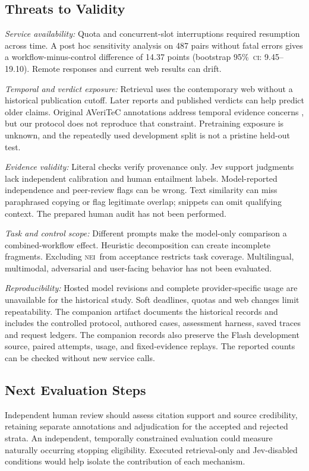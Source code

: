 \documentclass[conference]{IEEEtran}
\newcommand{\NEI}{\textsc{nei}}
\newcommand{\CI}{\textsc{ci}}
\newcommand{\pct}{\%}
\begin{document}
\subsection{Threats to Validity}
\textit{Service availability:} Quota and concurrent-slot interruptions required resumption across time. A post hoc sensitivity analysis on 487 pairs without fatal errors gives a workflow-minus-control difference of 14.37 points (bootstrap 95\pct\ \CI: 9.45--19.10). Remote responses and current web results can drift.

\textit{Temporal and verdict exposure:} Retrieval uses the contemporary web without a historical publication cutoff. Later reports and published verdicts can help predict older claims. Original AVeriTeC annotations address temporal evidence concerns \cite{averitec}, but our protocol does not reproduce that constraint. Pretraining exposure is unknown, and the repeatedly used development split is not a pristine held-out test.

\textit{Evidence validity:} Literal checks verify provenance only. Jev support judgments lack independent calibration and human entailment labels. Model-reported independence and peer-review flags can be wrong. Text similarity can miss paraphrased copying or flag legitimate overlap; snippets can omit qualifying context. The prepared human audit has not been performed.

\textit{Task and control scope:} Different prompts make the model-only comparison a combined-workflow effect. Heuristic decomposition can create incomplete fragments. Excluding \NEI\ from acceptance restricts task coverage. Multilingual, multimodal, adversarial and user-facing behavior has not been evaluated.

\textit{Reproducibility:} Hosted model revisions and complete provider-specific usage are unavailable for the historical study. Soft deadlines, quotas and web changes limit repeatability. The companion artifact documents the historical records and includes the controlled protocol, authored cases, assessment harness, saved traces and request ledgers. The companion records also preserve the Flash development source, paired attempts, usage, and fixed-evidence replays. The reported counts can be checked without new service calls.

\subsection{Next Evaluation Steps}
Independent human review should assess citation support and source credibility, retaining separate annotations and adjudication for the accepted and rejected strata. An independent, temporally constrained evaluation could measure naturally occurring stopping eligibility. Executed retrieval-only and Jev-disabled conditions would help isolate the contribution of each mechanism.
\end{document}
